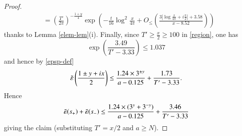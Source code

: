 \begin{proof}
\begin{align*}
&= \left(\frac{T'}{2\pi}\right)^{-\frac{1+y}{4}} \exp\left( - \frac{t}{16} \log^2 \frac{x}{4\pi} + O_{\leq}\left( \frac{3 |\log \frac{x}{4\pi} + i \frac{\pi}{2}|+3.58}{x-8.52} \right) \right)
\end{align*}
thanks to Lemma \ref{elem-lem}(i).  Finally, since $T' \geq \frac{x}{2} \geq 100$ in \eqref{region}, one has 
$$\exp\left(\frac{3.49}{T'-3.33}\right) \leq 1.037$$
and hence by \eqref{epsp-def}
$$ 
\tilde {\varepsilon}\left(\frac{1 \pm y+ix}{2}\right) \leq \frac{1.24 \times 3^{\pm y}}{a-0.125} + \frac{1.73}{T'-3.33}.$$
Hence
$$
\tilde {\varepsilon}(s_+) + \tilde {\varepsilon}(s_-) \leq \frac{1.24 \times (3^y+3^{-y})}{a-0.125} + \frac{3.46}{T'-3.33}$$
giving the claim (substituting $T' = x/2$ and $a \geq N$).
\end{proof}
